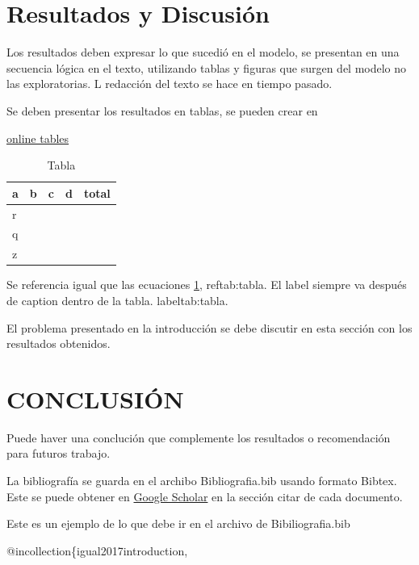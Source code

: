 \documentclass[twocolumn,10pt]{article}
\begin{document}
\section{Resultados y Discusión}

Los resultados deben expresar lo que sucedió en el modelo, se presentan en una secuencia lógica en el texto, utilizando tablas y figuras que surgen del modelo no las exploratorias. L redacción del texto se hace en tiempo pasado. 

Se deben presentar los resultados en tablas, se pueden crear en

\href{https://www.tablesgenerator.com}{online tables}


\begin{table}[H]
\centering
    \begin{tabular}{|l|l|l|l|l|}
\hline
a & b & c & d & total \\ \hline
r &   &   &   &       \\ \hline
q &   &   &   &       \\ \hline
z &   &   &   &       \\ \hline
\end{tabular}
\caption{Tabla}
    \label{tab:tabla}
    
\end{table}

Se referencia igual que las ecuaciones \ref{tab:tabla}, ref{tab:tabla}. El label siempre va después de caption dentro de la tabla. label{tab:tabla}.




El problema presentado en la introducción se debe discutir en esta sección con los resultados obtenidos. 

\section{CONCLUSIÓN}

Puede haver una conclución que complemente los resultados o recomendación para futuros trabajo. 


La bibliografía se guarda en el archibo Bibliografia.bib usando formato Bibtex. Este se puede obtener en \href{https://scholar.google.com/scholar?hl=es&as_sdt=0,5&q=introduction+to+data+science}{Google Scholar} en la sección citar de cada documento.

Este es un ejemplo de lo que debe ir en el archivo de Bibiliografia.bib


\makeatletter @incollection\{igual2017introduction,
\end{document}

